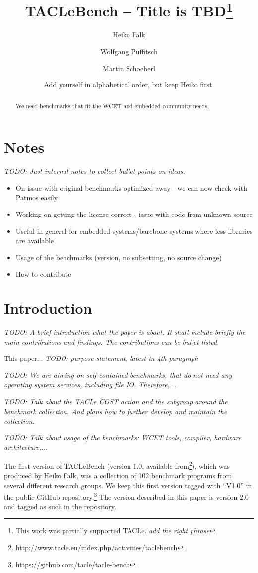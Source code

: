 \documentclass[a4paper,UKenglish]{oasics}
\title{TACLeBench -- Title is TBD\footnote{This work was partially supported TACLe. \emph{add the right phrase}}}
\author[1]{Heiko Falk}
\author[2]{Wolfgang Puffitsch}
\author[2]{Martin Schoeberl}
\author[2]{Add yourself in alphabetical order, but keep Heiko first.}
\affil[1]{Dummy University Computing Laboratory\\
  Address, Country\\
  \texttt{open@dummyuni.org}}
\affil[2]{Technical University of Denmark, Department of Applied Mathematics and Computer Science, Denmark\\
  \texttt{\{wopu, masca\}@dtu.dk}}
\newcommand{\todo}[1]{{\emph{TODO: #1}}}
\begin{document}
\maketitle

\begin{abstract}
We need benchmarks that fit the WCET and embedded community needs,
 \end{abstract}

\section{Notes}

\todo{Just internal notes to collect bullet points on ideas.}

\begin{itemize}
\item On issue with original benchmarks optimized away - we can now check with Patmos easily
\item Working on getting the license correct - issue with code from unknown source
\item Useful in general for embedded systems/barebone systems where less libraries are available
\item Usage of the benchmarks (version, no subsetting, no source change)
\item How to contribute
\end{itemize}

\section{Introduction}
\label{sec:intro}

\todo{A brief introduction what the paper is about. It shall include briefly the
main contributions and findings. The contributions can be bullet listed.}

This paper... \todo{purpose statement, latest in 4th paragraph}

\todo{We are aiming on self-contained benchmarks, that do not need any
operating system services, including file IO. Therefore,...}

\todo{Talk about the TACLe COST action and the subgroup around the benchmark
collection. And plans how to further develop and maintain the collection.}

\todo{Talk about usage of the benchmarks: WCET tools, compiler, hardware
architecture,...}

The first version of TACLeBench (version 1.0, available
from\footnote{\url{http://www.tacle.eu/index.php/activities/taclebench}}), which was produced
by Heiko Falk, was a collection of 102 benchmark programs from several different
research groups. We keep this first version tagged with ``V1.0'' in the public
GitHub repository.\footnote{\url{https://github.com/tacle/tacle-bench}}
The version described in this paper is version 2.0 and tagged as such in the
repository.
\end{document}
